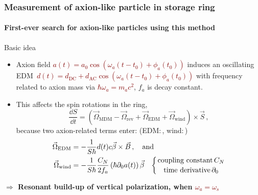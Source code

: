 \begin{frame}
\frametitle{Measurement of axion-like particle in storage ring}
\framesubtitle{\textbf{First-ever search for axion-like particles using this method}}


\begin{block}{Basic idea}
	\begin{itemize}
		\item Axion field \textcolor{Maroon}{$a(t) = a_0\cos\left( \omega_a (t-t_0) + \phi_a(t_0) \right)$} \newline
		induces an oscillating EDM\,\textcolor{PineGreen}{\small \cite{PhysRevD.84.055013}} \textcolor{Maroon}{$d(t) = d_\text{DC} + d_\text{AC}\cos\left( \omega_a (t-t_0) + \phi_a(t_0) \right)$} \newline
		with frequency related to axion mass via \textcolor{Maroon}{$\hbar \omega_a = m_a c^2$}, $f_a$ is decay constant.
		\item This affects the spin rotations in the ring,
		$$ \frac{\dd S}{\dd t} = \left(\vec \Omega_\text{MDM} - \vec \Omega_\text{rev} + \vec \Omega_\text{EDM} + \vec \Omega_\text{wind} \right)\times \vec S\,, $$
		because two axion-related terms enter: (EDM:\,\textcolor{PineGreen}{\small \cite{PhysRevD.84.055013}}, wind:\,\textcolor{PineGreen}{\small \cite{PhysRevD.88.035023}})
		{\color{Maroon}
		\begin{equation}
		\begin{split} 
		\vec \Omega_\text{EDM} & =  -\frac{1}{S \hbar} d(t) c \vec \beta \times \vec B\,, \quad \text{and} \\ 
		\vec \Omega_\text{wind} & = -\frac{1}{S \hbar} \frac{C_N}{2 f_a} \left( \hbar \partial_0 a(t) \right)  \vec \beta \quad \biggl\{ {{\text{coupling constant}\, C_N} \atop {\text{time derivative}\, \partial_0}}
		\end{split}
		\end{equation}}
	 \end{itemize}
\end{block}


\begin{alertblock}{}  
\textbf{$\Rightarrow$ Resonant build-up of vertical polarization, when \textcolor{Maroon}{$\omega_a = \omega_s$}}	
\end{alertblock}

\end{frame}
